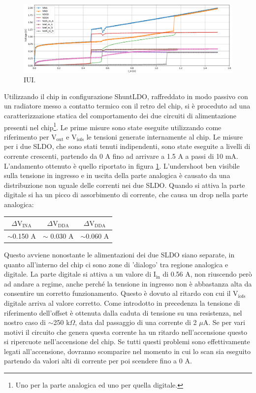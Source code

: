 \begin{figure}
\centering
\includegraphics[scale=.3]{Immagini/IUI2}
\caption{IUI.}
\label{IUI}
\end{figure}
Utilizzando il chip in configurazione ShuntLDO, raffreddato in modo passivo con un radiatore messo a contatto termico con il retro del chip, si è proceduto ad una caratterizzazione statica del comportamento dei due circuiti di alimentazione presenti nel chip\footnote{Uno per la parte analogica ed uno per quella digitale.}. 
Le prime misure sono state eseguite utilizzando come riferimento per $\mathrm{V_{out}}$ e $\mathrm{V_{iofs}}$ le tensioni generate internamente al chip. Le misure per i due SLDO, che sono stati tenuti indipendenti, sono state eseguite a livelli di corrente crescenti, partendo da 0 A fino ad arrivare a 1.5 A a passi di 10 mA. 
L'andamento ottenuto è quello riportato in figura \ref{IUI}. L'undershoot ben visibile sulla tensione in ingresso e in uscita della parte analogica è causato da una distribuzione non uguale delle correnti nei due SLDO. 
Quando si attiva la parte digitale si ha un picco di assorbimento di corrente, che causa un drop nella parte analogica:
\begin{center}
\begin{tabular}{ccc }
\hline
$\Delta \mathrm{V_{INA}}$ & $\Delta \mathrm{V_{DDA}}$ &$\Delta \mathrm{V_{DDA}}$  \\ \hline
$\sim$0.150 A & $\sim$ 0.030 A& $\sim$0.060 A\\ \hline     
\end{tabular}
\end{center}

Questo avviene nonostante le alimentazioni dei due SLDO siano separate, in quanto all'interno del chip ci sono zone di 'dialogo' tra regione analogica e digitale. 
La parte digitale si attiva a un valore di $\mathrm{I_{in}}$ di 0.56 A, non riuscendo però ad andare a regime, anche perché la tensione in ingresso non è abbastanza alta da consentire un corretto funzionamento.
Questo è dovuto al ritardo con cui il $\mathrm{V_{iofs}}$ digitale arriva al valore corretto. Come introdotto in precedenza la tensione di riferimento dell'offset è ottenuta dalla caduta di tensione su una resistenza, nel nostro caso di $\sim$250 k$\Omega$, data dal passaggio di una corrente di 2 $\mu$A. Se per vari motivi il circuito che genera questa corrente ha un ritardo nell'accensione questo si ripercuote nell'accensione del chip.  
Se tutti questi problemi sono effettivamente legati all'accensione, dovranno scomparire nel momento in cui lo scan sia eseguito partendo da valori alti di corrente per poi scendere fino a 0 A.

